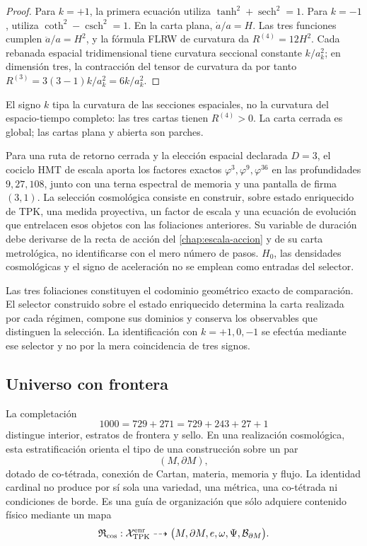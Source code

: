 \begin{proof}
Para \(k=+1\), la primera ecuación utiliza
\(\tanh^2+\operatorname{sech}^2=1\). Para \(k=-1\), utiliza
\(\coth^2-\operatorname{csch}^2=1\). En la carta plana,
\(\dot a/a=H\). Las tres funciones cumplen
\(\ddot a/a=H^2\), y la fórmula FLRW de curvatura da
\(R^{(4)}=12H^2\). Cada rebanada espacial tridimensional tiene curvatura
seccional constante \(k/a_k^2\); en dimensión tres, la contracción del tensor
de curvatura da por tanto
\(R^{(3)}=3(3-1)k/a_k^2=6k/a_k^2\).
\end{proof}

El signo \(k\) tipa la curvatura de las secciones espaciales, no la
curvatura del espacio-tiempo completo: las tres cartas tienen
\(R^{(4)}>0\). La carta cerrada es global; las cartas plana y abierta son
parches.

\begin{statusbox}
    Para una ruta de retorno cerrada y la elección espacial declarada
    \(D=3\), el cociclo HMT de escala aporta los factores exactos
    \(\varphi^3,\varphi^9,\varphi^{36}\) en las profundidades
    \(9,27,108\), junto con una terna espectral de memoria y una pantalla de
    firma \((3,1)\). La selección cosmológica consiste en construir, sobre
    estado enriquecido de TPK, una medida proyectiva, un factor de escala y una ecuación de
    evolución que entrelacen esos objetos con las foliaciones anteriores. Su
    variable de duración debe derivarse de la recta de acción del
    \cref{chap:escala-accion} y de su carta metrológica, no identificarse con
    el mero número de pasos. \(H_0\), las densidades cosmológicas y el signo
    de aceleración no se emplean como entradas del selector.
\end{statusbox}

Las tres foliaciones constituyen el codominio geométrico exacto de
comparación. El selector construido sobre el estado enriquecido determina la
carta realizada por cada régimen, compone sus dominios y conserva los
observables que distinguen la selección. La identificación con
\(k=+1,0,-1\) se efectúa mediante ese selector y no por la mera coincidencia
de tres signos.

\subsection{Universo con frontera}
\label{sec:universo-con-frontera-hmt}

La completación
\[
 1000=729+271=729+243+27+1
\]
distingue interior, estratos de frontera y sello. En una realización
cosmológica, esta estratificación orienta el tipo de una construcción sobre
un par
\[
 (M,\partial M),
\]
dotado de co-tétrada, conexión de Cartan, materia, memoria y flujo. La
identidad cardinal no produce por sí sola una variedad, una métrica, una
co-tétrada ni condiciones de borde. Es una guía de organización que sólo
adquiere contenido físico mediante un mapa
\[
 \mathfrak R_{\rm cos}:
 \mathcal X_{\rm TPK}^{\rm enr}
 \dashrightarrow
 \bigl(M,\partial M,e,\omega,\Psi,\mathcal B_{\partial M}\bigr).
\]

